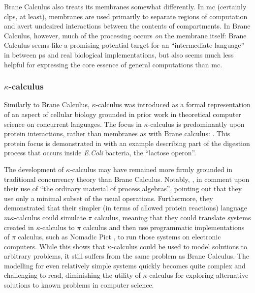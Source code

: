 Brane Calculus also treats its membranes somewhat differently.  In \gls{mc} (certainly \gls{clps}, at least), membranes are used primarily to separate regions of computation and avert undesired interactions between the contents of \glspl{compartment}.  In Brane Calculus, however, much of the processing occurs \emph{on} the membrane itself:   Brane Calculus seems like a promising potential target for an ``intermediate language'' in between \gls{ps} and real biological implementations, but also seems much less helpful for expressing the core essence of general computations than \gls{mc}.

\subsubsection{\(\kappa\)-calculus}

Similarly to Brane Calculus, \(\kappa\)-calculus \cite{Danos2004} was introduced as a formal representation of an aspect of cellular biology grounded in prior work in theoretical computer science on concurrent languages.  The focus in \(\kappa\)-calculus is predominantly upon protein interactions, rather than membranes as with Brane calculus: .  This protein focus is demonstrated in \cite{Danos2004} with an example describing part of the digestion process that occurs inside \textit{E.Coli} bacteria, the \enquote{lactose operon}.

The development of \(\kappa\)-calculus may have remained more firmly grounded in traditional concurrency theory than Brane Calculus.  Notably, \citeauthor{Danos2004}, in  comment upon their use of \enquote{the ordinary material of process algebras}, pointing out that they use only a minimal subset of the usual operations.  Furthermore, they demonstrated that their simpler (in terms of allowed protein reactions) language \(m\kappa\)-calculus could simulate \(\pi\) calculus, meaning that they could translate systems created in \(\kappa\)-calculus to \(\pi\) calculus and then use programmatic implementations of \(\pi\) calculus, such as Nomadic Pict \cite{Unyapoth2001}, to run those systems on electronic computers.  While this shows that \(\kappa\)-calculus could be used to model solutions to arbitrary problems, it still suffers from the same problem as Brane Calculus.  The modelling for even relatively simple systems quickly becomes quite complex and challenging to read, diminishing the utility of \(\kappa\)-calculus for exploring alternative solutions to known problems in computer science.

